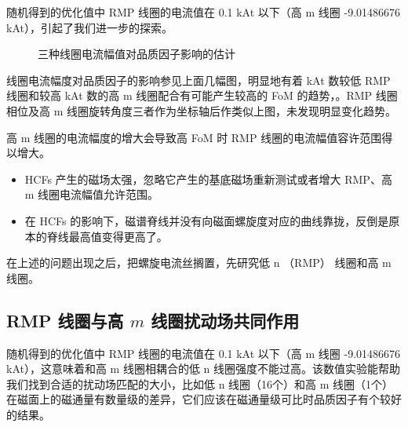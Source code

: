   随机得到的优化值中 RMP 线圈的电流值在 0.1 kAt 以下（高 m 线圈 -9.01486676 kAt），引起了我们进一步的探索。
  
  
  
\begin{figure}[t]
\centering
\label{fig:kAt-FoM}
{}%
{}
\caption{三种线圈电流幅值对品质因子影响的估计}
\end{figure}
  
  

线圈电流幅度对品质因子的影响参见上面几幅图，明显地有着 kAt 数较低 RMP 线圈和较高 kAt 数的高 m 线圈配合有可能产生较高的 FoM 的趋势，。RMP 线圈相位及高 m 线圈旋转角度三者作为坐标轴后作类似上图，未发现明显变化趋势。
  

高 m 线圈的电流幅度的增大会导致高 FoM 时 RMP 线圈的电流幅值容许范围得以增大。
  
  
  
  \begin{itemize}
    \item HCFs 产生的磁场太强，忽略它产生的基底磁场重新测试或者增大 RMP、高 m 线圈电流幅值允许范围。
    \item 在 HCFs 的影响下，磁谱脊线并没有向磁面螺旋度对应的曲线靠拢，反倒是原本的脊线最高值变得更高了。 
  \end{itemize}


在上述的问题出现之后，把螺旋电流丝搁置，先研究低 n （RMP） 线圈和高 m 线圈。


\subsection{RMP 线圈与高 $m$ 线圈扰动场共同作用}
随机得到的优化值中 RMP 线圈的电流值在 0.1 kAt 以下（高 m 线圈 -9.01486676 kAt），这意味着和高 m 线圈相耦合的低 n 线圈强度不能过高。该数值实验能帮助我们找到合适的扰动场匹配的大小，比如低 n 线圈（16个）和高 m 线圈（1个）在磁面上的磁通量有数量级的差异，它们应该在磁通量级可比时品质因子有个较好的结果。

